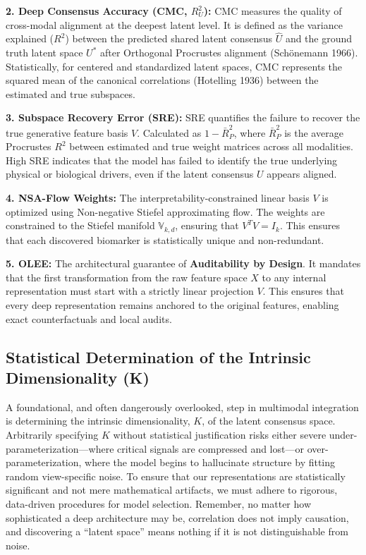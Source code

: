 \documentclass[
  letterpaper,
]{report}
\begin{document}
\textbf{2. Deep Consensus Accuracy (CMC, \(R^2_U\)):} CMC measures the
quality of cross-modal alignment at the deepest latent level. It is
defined as the variance explained (\(R^2\)) between the predicted shared
latent consensus \(\hat{U}\) and the ground truth latent space \(U^*\)
after Orthogonal Procrustes alignment (Schönemann 1966). Statistically,
for centered and standardized latent spaces, CMC represents the squared
mean of the canonical correlations (Hotelling 1936) between the
estimated and true subspaces.

\textbf{3. Subspace Recovery Error (SRE):} SRE quantifies the failure to
recover the true generative feature basis \(V\). Calculated as
\(1 - \bar{R}^2_P\), where \(\bar{R}^2_P\) is the average Procrustes
\(R^2\) between estimated and true weight matrices across all
modalities. High SRE indicates that the model has failed to identify the
true underlying physical or biological drivers, even if the latent
consensus \(U\) appears aligned.

\textbf{4. NSA-Flow Weights:} The interpretability-constrained linear
basis \(V\) is optimized using Non-negative Stiefel approximating flow.
The weights are constrained to the Stiefel manifold
\(\mathbb{V}_{k,d}\), ensuring that \(V^T V = I_k\). This ensures that
each discovered biomarker is statistically unique and non-redundant.

\textbf{5. OLEE:} The architectural guarantee of \textbf{Auditability by
Design}. It mandates that the first transformation from the raw feature
space \(X\) to any internal representation must start with a strictly
linear projection \(V\). This ensures that every deep representation
remains anchored to the original features, enabling exact
counterfactuals and local audits.

\subsection{Statistical Determination of the Intrinsic Dimensionality
(K)}\label{statistical-determination-of-the-intrinsic-dimensionality-k}

A foundational, and often dangerously overlooked, step in multimodal
integration is determining the intrinsic dimensionality, \(K\), of the
latent consensus space. Arbitrarily specifying \(K\) without statistical
justification risks either severe under-parameterization---where
critical signals are compressed and lost---or over-parameterization,
where the model begins to hallucinate structure by fitting random
view-specific noise. To ensure that our representations are
statistically significant and not mere mathematical artifacts, we must
adhere to rigorous, data-driven procedures for model selection.
Remember, no matter how sophisticated a deep architecture may be,
correlation does not imply causation, and discovering a ``latent space''
means nothing if it is not distinguishable from noise.
\end{document}
